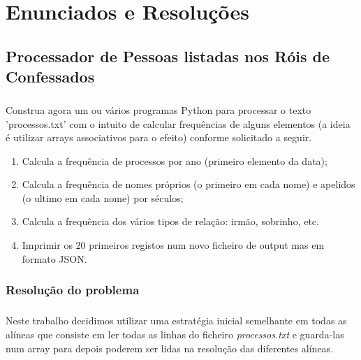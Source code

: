 \documentclass[11pt,a4paper]{report}
\begin{document}
    \chapter{Enunciados e Resoluções}
    \section{Processador de Pessoas listadas nos Róis de Confessados}
    \paragraph{}
    Construa agora um ou vários programas Python para processar o texto 'processos.txt' com o intuito de calcular frequências de alguns elementos (a ideia é utilizar arrays associativos para o efeito) conforme solicitado a seguir.

    \begin{enumerate}[label=\alph*)]
        \item Calcula a frequência de processos por ano (primeiro elemento da data);
        \item Calcula a frequência de nomes próprios (o primeiro em cada nome) e apelidos (o ultimo em cada nome) por séculos;
        \item Calcula a frequência dos vários tipos de relação: irmão, sobrinho, etc.
        \item Imprimir os 20 primeiros registos num novo ficheiro de output mas em formato JSON.
    \end{enumerate}

    \subsection{Resolução do problema}
    \paragraph{}
    Neste trabalho decidimos utilizar uma estratégia inicial semelhante em todas as alíneas que consiste em ler todas as linhas do ficheiro \textit{processos.txt} e guarda-las num array para depois poderem ser lidas na resolução das diferentes alíneas.
\end{document}
